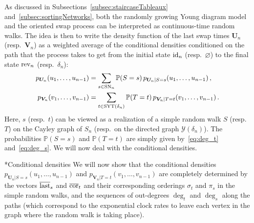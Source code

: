 \documentclass[a4paper,reqno,12pt]{amsart}
\makeatletter
\theoremstyle{plain}
\theoremstyle{definition}
\renewcommand\subsubsection{\@startsection{subsubsection}{3}%
  \z@{.5\linespacing\@plus.7\linespacing}{-.5em}%
  {\scshape}}
\newcommand{\syt}{\textnormal{SYT}}
\newcommand{\staircase}{\delta}
\newcommand{\young}{\mathcal{Y}}
\newcommand{\sort}{\textnormal{SN}}
\newcommand{\diag}{\textnormal{cor}}
\newcommand{\diagsorted}{\overline{\diag}}
\newcommand{\rev}{\textnormal{rev}}
\newcommand{\id}{\textnormal{id}}
\newcommand{\fin}{\textnormal{last}}
\newcommand{\finsorted}{\overline{\fin}}
\renewcommand{\P}{\mathbb{P}}
\newcommand{\1}{\mathbbm{1}}
\renewcommand{\emptyset}{\varnothing}
\makeatother
\begin{document}
As discussed in Subsections~\ref{subsec:staircaseTableaux} and~\ref{subsec:sortingNetworks}, both the randomly growing Young diagram model and the oriented swap process can be interpreted as continuous-time random walks.
The idea is then to write the density function of the last swap times $\bm{U}_n$ (resp.\ $\bm{V}_n$) as a weighted average of the conditional densities conditioned on the path that the process takes to get from the initial state $\id_n$  (resp.\   $\emptyset$) to the final state $\rev_n$ (resp.\  $\staircase_n$):
\begin{equation}
\label{eq:decomposition}
\begin{split}
 p_{\bm{U}_n}(u_1,\ldots,u_{n-1}) &= \sum_{s \in \sort_n} \P(S=s)  \, p_{\bm{U}_n|S=s}(u_1,\ldots,u_{n-1}) \, ,
 \\
p_{\bm{V}_n}(v_1,\ldots,v_{n-1})&= \sum_{t \in \syt(\staircase_n)} \P(T=t) \, p_{\bm{V}_n|T=t}(v_1,\ldots,v_{n-1}) \, .
\end{split}
\end{equation}
Here, $s$ (resp.\ $t$) can be viewed as a realization of a simple random walk $S$ (resp.\  $T$) on  the Cayley graph of $S_n$ (resp.\ on the directed graph $\young(\staircase_n)$).
The probabilities $\P(S=s)$ and $\P(T=t)$ are simply given by~\eqref{eq:deg_t} and~\eqref{eq:deg_s}.
We will now deal with the conditional densities.

\subsubsection*{Conditional densities}
We will now show that the conditional densities $p_{\bm{U}_n|S=s}(u_1,\ldots,u_{n-1})$ and $p_{\bm{V}_n|T=t}(v_1,\ldots,v_{n-1})$ are completely determined by the vectors $\finsorted_s$ and $\diagsorted_t$ and their corresponding orderings $\sigma_t$ and $\pi_s$ in the simple random walks, and the sequences of out-degrees $\deg_t$ and $\deg_s$ along the paths (which correspond to the exponential clock rates to leave each vertex in the graph where the random walk is taking place).
\end{document}
